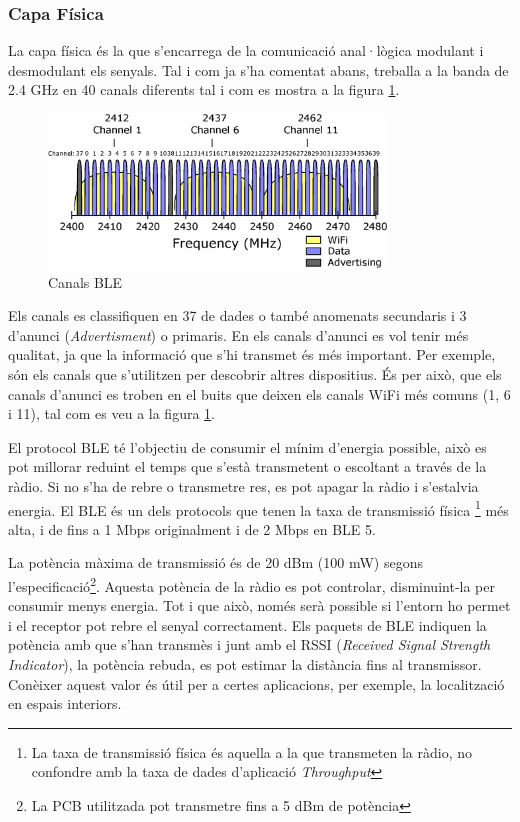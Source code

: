 \subsubsection{Capa Física}
La capa física és la que s'encarrega de la comunicació anal·lògica modulant i desmodulant els senyals.
Tal i com ja s'ha comentat abans, treballa a la banda de 2.4 GHz en 40 canals diferents tal i com es mostra a la figura \ref{BLE_Channels}.

\begin{figure}[hb]
	\begin{center}
		\includegraphics[width=0.8\textwidth]{./diagrames/BLE_WiFi}
		\caption{Canals BLE \cite{ble_feq}}
		\label{BLE_Channels}
	\end{center}
\end{figure}

Els canals es classifiquen en 37 de dades o també anomenats secundaris i 3 d'anunci (\textit{Advertisment}) o primaris.
En els canals d'anunci es vol tenir més qualitat, ja que la informació que s'hi transmet és més important.
Per exemple, són els canals que s'utilitzen per descobrir altres dispositius.
És per això, que els canals d'anunci es troben en el buits que deixen els canals WiFi més comuns (1, 6 i 11), tal com es veu a la figura \ref{BLE_Channels}.

El protocol BLE té l'objectiu de consumir el mínim d'energia possible, això es pot millorar reduint el temps que s'està transmetent o escoltant a través de la ràdio.
Si no s'ha de rebre o transmetre res, es pot apagar la ràdio i s'estalvia energia.
El BLE és un dels protocols que tenen la taxa de transmissió física \footnote{La taxa de transmissió física és aquella a la que transmeten la ràdio, no confondre amb la taxa de dades d'aplicació \textit{Throughput}} més alta, i de fins a 1 Mbps originalment i de 2 Mbps en BLE 5.

La potència màxima de transmissió és de 20 dBm (100 mW) segons l'especificació\footnote{La PCB utilitzada pot transmetre fins a 5 dBm de potència}.
Aquesta potència de la ràdio es pot controlar, disminuint-la per consumir menys energia.
Tot i que això, només serà possible si l'entorn ho permet i el receptor pot rebre el senyal correctament.
Els paquets de BLE indiquen la potència amb que s'han transmès i junt amb el RSSI (\textit{Received Signal Strength Indicator}), la potència rebuda, es pot estimar la distància fins al transmissor.
Conèixer aquest valor és útil per a certes aplicacions, per exemple, la localització en espais interiors.

